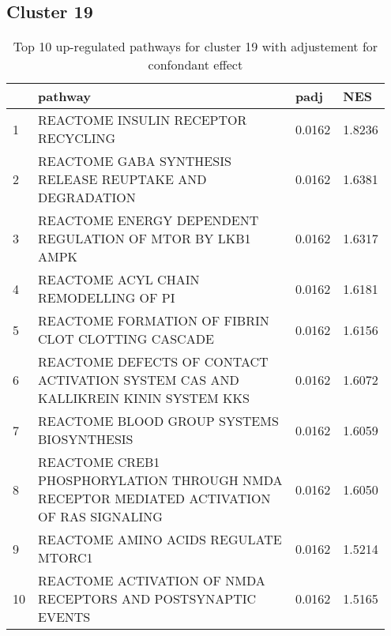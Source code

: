 \documentclass{article}
\begin{document}
\subsection{Cluster 19 }
\begin{table}[H]
\centering
\begin{tabular}{p{0.05\linewidth}p{0.7\linewidth}p{0.1\linewidth}p{0.1\linewidth}}
  \hline
 & pathway & padj & NES \\ 
  \hline
1 & REACTOME INSULIN RECEPTOR RECYCLING & 0.0162 & 1.8236 \\ 
  2 & REACTOME GABA SYNTHESIS RELEASE REUPTAKE AND DEGRADATION & 0.0162 & 1.6381 \\ 
  3 & REACTOME ENERGY DEPENDENT REGULATION OF MTOR BY LKB1 AMPK & 0.0162 & 1.6317 \\ 
  4 & REACTOME ACYL CHAIN REMODELLING OF PI & 0.0162 & 1.6181 \\ 
  5 & REACTOME FORMATION OF FIBRIN CLOT CLOTTING CASCADE & 0.0162 & 1.6156 \\ 
  6 & REACTOME DEFECTS OF CONTACT ACTIVATION SYSTEM CAS AND KALLIKREIN KININ SYSTEM KKS & 0.0162 & 1.6072 \\ 
  7 & REACTOME BLOOD GROUP SYSTEMS BIOSYNTHESIS & 0.0162 & 1.6059 \\ 
  8 & REACTOME CREB1 PHOSPHORYLATION THROUGH NMDA RECEPTOR MEDIATED ACTIVATION OF RAS SIGNALING & 0.0162 & 1.6050 \\ 
  9 & REACTOME AMINO ACIDS REGULATE MTORC1 & 0.0162 & 1.5214 \\ 
  10 & REACTOME ACTIVATION OF NMDA RECEPTORS AND POSTSYNAPTIC EVENTS & 0.0162 & 1.5165 \\ 
   \hline
\end{tabular}
\caption{Top 10 up-regulated pathways for cluster 19 with adjustement for confondant effect} 
\label{tab:q3_2_conf_19}
\end{table}
\end{document}
